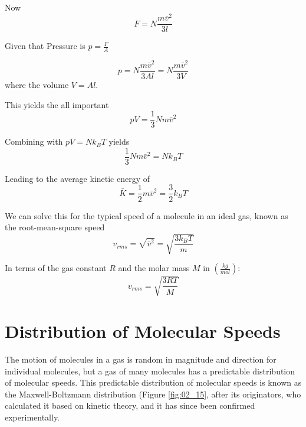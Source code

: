 \documentclass[14pt]{memoir}
\begin{document}
Now
\begin{equation}
F = N \frac{m \bar{v}^2}{3l}
\end{equation}

Given that Pressure is $p = \frac{F}{A}$

\begin{equation}
p = N \frac{m \bar{v}^2}{3Al} = N \frac{m \bar{v}^2}{3V} 
\end{equation}
where the volume $V = Al$.

This yields the all important
\begin{equation}
pV = \frac{1}{3} N m \bar{v}^2
\end{equation}

Combining with $pV = N k_B T$ yields
\begin{equation}
\frac{1}{3} N m \bar{v}^2 = N k_B T
\end{equation}

Leading to the average kinetic energy of
\begin{equation}
\bar{K} = \frac{1}{2} m \bar{v}^2 = \frac{3}{2} k_B T 
\end{equation}

We can solve this for the typical speed of a molecule in an ideal gas, known as the root-mean-square speed
\begin{equation}
v_{rms} = \sqrt{\bar{v}^2} = \sqrt{\frac{3 k_B T}{m}}
\end{equation}

In terms of the gas constant $R$ and the molar mass $M$ in $(\frac{kg}{mol})$:
\begin{equation}
v_{rms} = \sqrt{\frac{3 R T}{M}}
\end{equation}

\section{Distribution of Molecular Speeds}

The motion of molecules in a gas is random in magnitude and direction for individual molecules, but a gas of many molecules has a predictable distribution of molecular speeds. This predictable distribution of molecular speeds is known as the Maxwell-Boltzmann distribution (Figure \ref{fig:02_15}, after its originators, who calculated it based on kinetic theory, and it has since been confirmed experimentally. 
\end{document}
